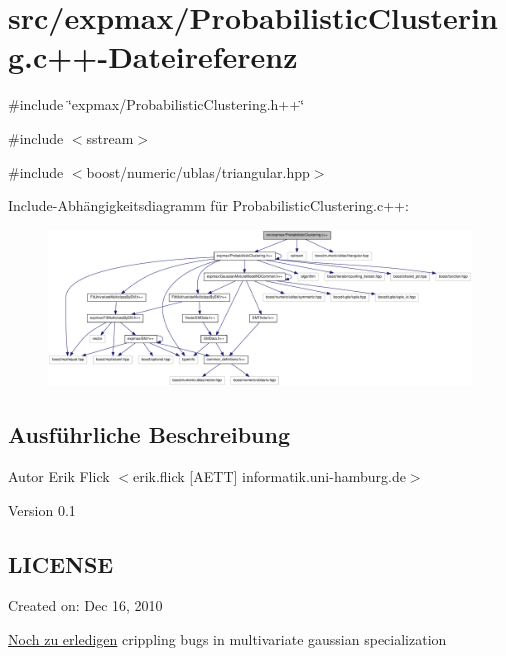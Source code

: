\hypertarget{ProbabilisticClustering_8c_09_09}{
\section{src/expmax/ProbabilisticClustering.c++-\/Dateireferenz}
\label{ProbabilisticClustering_8c_09_09}
}
{\ttfamily \#include \char`\"{}expmax/ProbabilisticClustering.h++\char`\"{}}\par
{\ttfamily \#include $<$sstream$>$}\par
{\ttfamily \#include $<$boost/numeric/ublas/triangular.hpp$>$}\par
Include-\/Abhängigkeitsdiagramm für ProbabilisticClustering.c++:\nopagebreak
\begin{figure}[H]
\begin{center}
\leavevmode
\includegraphics[width=420pt]{ProbabilisticClustering_8c_09_09__incl}
\end{center}
\end{figure}


\subsection{Ausführliche Beschreibung}
\begin{DoxyAuthor}{Autor}
Erik Flick $<$erik.flick \mbox{[}AETT\mbox{]} informatik.uni-\/hamburg.de$>$ 
\end{DoxyAuthor}
\begin{DoxyVersion}{Version}
0.1
\end{DoxyVersion}
\hypertarget{ProbabilisticClustering_8c_09_09_LICENSE}{}\subsection{LICENSE}\label{ProbabilisticClustering_8c_09_09_LICENSE}
Created on: Dec 16, 2010

\begin{Desc}
\item[\hyperlink{todo__todo000001}{Noch zu erledigen}]crippling bugs in multivariate gaussian specialization\end{Desc}
